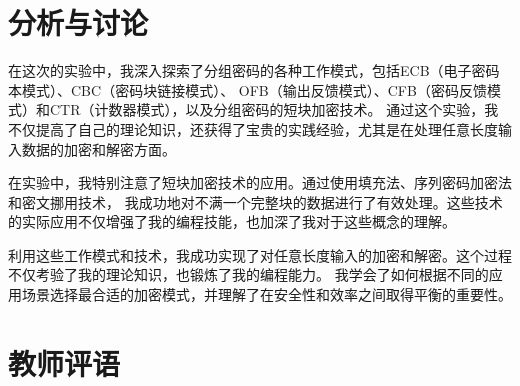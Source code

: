 \documentclass[a4paper,11pt,UTF8]{ctexart}
\begin{document}
\section{分析与讨论}
    在这次的实验中，我深入探索了分组密码的各种工作模式，包括ECB（电子密码本模式）、CBC（密码块链接模式）、
    OFB（输出反馈模式）、CFB（密码反馈模式）和CTR（计数器模式），以及分组密码的短块加密技术。
    通过这个实验，我不仅提高了自己的理论知识，还获得了宝贵的实践经验，尤其是在处理任意长度输入数据的加密和解密方面。\par
    在实验中，我特别注意了短块加密技术的应用。通过使用填充法、序列密码加密法和密文挪用技术，
    我成功地对不满一个完整块的数据进行了有效处理。这些技术的实际应用不仅增强了我的编程技能，也加深了我对于这些概念的理解。\par
    利用这些工作模式和技术，我成功实现了对任意长度输入的加密和解密。这个过程不仅考验了我的理论知识，也锻炼了我的编程能力。
    我学会了如何根据不同的应用场景选择最合适的加密模式，并理解了在安全性和效率之间取得平衡的重要性。

\section{教师评语}
\end{document}
